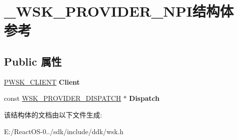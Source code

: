 \hypertarget{struct___w_s_k___p_r_o_v_i_d_e_r___n_p_i}{}\section{\+\_\+\+W\+S\+K\+\_\+\+P\+R\+O\+V\+I\+D\+E\+R\+\_\+\+N\+P\+I结构体 参考}
\label{struct___w_s_k___p_r_o_v_i_d_e_r___n_p_i}
\subsection*{Public 属性}
\begin{DoxyCompactItemize}
\item 
\mbox{\label{struct___w_s_k___p_r_o_v_i_d_e_r___n_p_i_a322e7ee43434d68606b9ce9dd1a23d2e}} 
\hyperlink{interfacevoid}{P\+W\+S\+K\+\_\+\+C\+L\+I\+E\+NT} {\bfseries Client}
\item 
\mbox{\label{struct___w_s_k___p_r_o_v_i_d_e_r___n_p_i_a9e054c3cf2501d6750d3ee399c1f4c6e}} 
const \hyperlink{struct___w_s_k___p_r_o_v_i_d_e_r___d_i_s_p_a_t_c_h}{W\+S\+K\+\_\+\+P\+R\+O\+V\+I\+D\+E\+R\+\_\+\+D\+I\+S\+P\+A\+T\+CH} $\ast$ {\bfseries Dispatch}
\end{DoxyCompactItemize}


该结构体的文档由以下文件生成\+:\begin{DoxyCompactItemize}
\item 
E\+:/\+React\+O\+S-\/0../sdk/include/ddk/wsk.\+h\end{DoxyCompactItemize}

